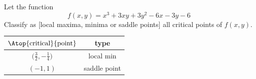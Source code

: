 \begin{question}[M200 2010D] %
Let the function
\begin{equation*}
f(x,y) = x^3+3xy+3y^2-6x-3y-6
\end{equation*}
Classify as $\big[$local maxima, minima or saddle points$\big]$
all critical points of $f(x,y)$.
\end{question}

%

\begin{answer}
\begin{center}
\renewcommand{\arraystretch}{1.3}
     \begin{tabular}{|c|c|}
     \hline
    $\Atop{\text{critical}}{\text{point}}$   & type \\    
    \hline
     $\big(\frac{3}{2},-\frac{1}{4}\big)$  & local min  \\ \hline
     $(-1,1)$  &  saddle point \\  \hline
     \end{tabular}
\renewcommand{\arraystretch}{1.0}
\end{center}
\end{answer}

